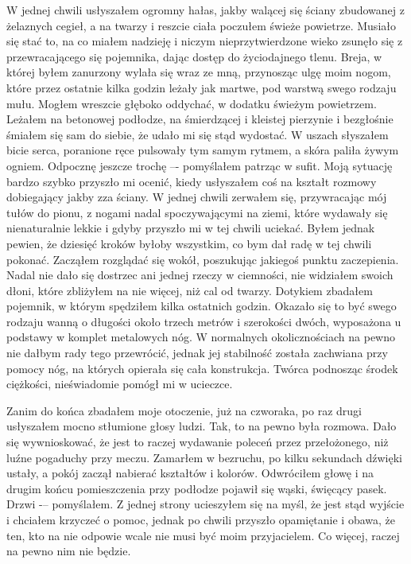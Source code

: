 W jednej chwili usłyszałem ogromny hałas, jakby walącej się ściany zbudowanej z żelaznych cegieł, a na twarzy i reszcie ciała poczułem świeże powietrze. Musiało się stać to, na co miałem nadzieję i niczym nieprzytwierdzone wieko zsunęło się z przewracającego się pojemnika, dając dostęp do życiodajnego tlenu. Breja, w której byłem zanurzony wylała się wraz ze mną, przynosząc ulgę moim nogom, które przez ostatnie kilka godzin leżały jak martwe, pod warstwą swego rodzaju mułu. Mogłem wreszcie głęboko oddychać, w dodatku świeżym powietrzem. Leżałem na betonowej podłodze, na śmierdzącej i kleistej pierzynie i bezgłośnie śmiałem się sam do siebie, że udało mi się stąd wydostać. W uszach słyszałem bicie serca, poranione ręce pulsowały tym samym rytmem, a skóra paliła żywym ogniem. Odpocznę jeszcze trochę –- pomyślałem patrząc w sufit. Moją sytuację bardzo szybko przyszło mi ocenić, kiedy usłyszałem coś na kształt rozmowy dobiegający jakby zza ściany. W jednej chwili zerwałem się, przywracając mój tułów do pionu, z nogami nadal spoczywającymi na ziemi, które wydawały się nienaturalnie lekkie i gdyby przyszło mi w tej chwili uciekać. Byłem jednak pewien, że dziesięć kroków byłoby wszystkim, co bym dał radę w tej chwili pokonać. Zacząłem rozglądać się wokół, poszukując jakiegoś punktu zaczepienia. Nadal nie dało się dostrzec ani jednej rzeczy w ciemności, nie widziałem swoich dłoni, które zbliżyłem na nie więcej, niż cal od twarzy. Dotykiem zbadałem pojemnik, w którym spędziłem kilka ostatnich godzin. Okazało się to być swego rodzaju wanną o długości około trzech metrów i szerokości dwóch, wyposażona u podstawy w komplet metalowych nóg. W normalnych okolicznościach na pewno nie dałbym rady tego przewrócić, jednak jej stabilność została zachwiana przy pomocy nóg, na których opierała się cała konstrukcja. Twórca podnosząc środek ciężkości, nieświadomie pomógł mi w ucieczce. 

Zanim do końca zbadałem moje otoczenie, już na czworaka, po raz drugi usłyszałem mocno stłumione głosy ludzi. Tak, to na pewno była rozmowa. Dało się wywnioskować, że jest to raczej wydawanie poleceń przez przełożonego, niż luźne pogaduchy przy meczu. Zamarłem w bezruchu, po kilku sekundach dźwięki ustały, a pokój zaczął nabierać kształtów i kolorów. Odwróciłem głowę i na drugim końcu pomieszczenia przy podłodze pojawił się wąski, święcący pasek. Drzwi -– pomyślałem. Z jednej strony ucieszyłem się na myśl, że jest stąd wyjście i chciałem krzyczeć o pomoc, jednak po chwili przyszło opamiętanie i obawa, że ten, kto na nie odpowie wcale nie musi być moim przyjacielem. Co więcej, raczej na pewno nim nie będzie. 

